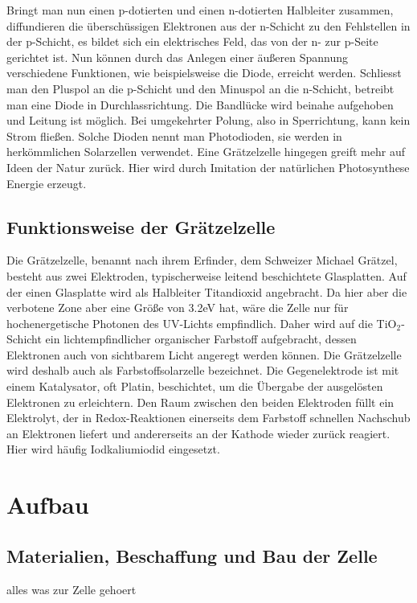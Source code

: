 \documentclass[11pt]{scrartcl}
\begin{document}
Bringt man nun einen p-dotierten und einen n-dotierten Halbleiter zusammen, diffundieren die \"ubersch\"ussigen Elektronen aus der n-Schicht zu den Fehlstellen in der p-Schicht, es bildet sich ein elektrisches Feld, das von der n- zur p-Seite gerichtet ist. Nun k\"onnen durch das Anlegen einer \"au\ss{}eren Spannung verschiedene Funktionen, wie beispielsweise die Diode, erreicht werden. Schliesst man den Pluspol an die p-Schicht und den Minuspol an die n-Schicht, betreibt man eine Diode in Durchlassrichtung. Die Bandl\"ucke wird beinahe aufgehoben und Leitung ist m\"oglich.\newline
Bei umgekehrter Polung, also in Sperrichtung, kann kein Strom flie\ss{}en. Solche Dioden nennt man Photodioden, sie werden in herk\"ommlichen Solarzellen verwendet. Eine Gr\"atzelzelle hingegen greift mehr auf Ideen der Natur zur\"uck. Hier wird durch Imitation der nat\"urlichen Photosynthese Energie erzeugt.

\subsection{Funktionsweise der Gr\"atzelzelle}
Die Gr\"atzelzelle, benannt nach ihrem Erfinder, dem Schweizer Michael Gr\"atzel, besteht aus zwei Elektroden, typischerweise leitend beschichtete Glasplatten. Auf der einen Glasplatte wird als Halbleiter Titandioxid angebracht. Da hier aber die verbotene Zone aber eine Gr\"o\ss{}e von 3.2eV hat, w\"are die Zelle nur f\"ur hochenergetische Photonen des UV-Lichts empfindlich. Daher wird auf die TiO$_{2}$-Schicht ein lichtempfindlicher organischer Farbstoff aufgebracht, dessen Elektronen auch von sichtbarem Licht angeregt werden k\"onnen. Die Gr\"atzelzelle wird deshalb auch als Farbstoffsolarzelle bezeichnet.\newline
Die Gegenelektrode ist mit einem Katalysator, oft Platin, beschichtet, um die \"Ubergabe der ausgel\"osten Elektronen zu erleichtern. Den Raum zwischen den beiden Elektroden f\"ullt ein Elektrolyt, der in Redox-Reaktionen einerseits dem Farbstoff schnellen Nachschub an Elektronen liefert und andererseits an der Kathode wieder zur\"uck reagiert. Hier wird h\"aufig Iodkaliumiodid eingesetzt.

\section{Aufbau}
\subsection{Materialien, Beschaffung und Bau der Zelle}
alles was zur Zelle gehoert
\end{document}
